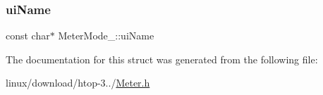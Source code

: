 \mbox{\label{structMeterMode___aa341af0bcb7b2cf5eb53386a21e1d95d}} 
\subsubsection{\texorpdfstring{ui\+Name}{uiName}}
{\footnotesize\ttfamily const char$\ast$ Meter\+Mode\+\_\+\+::ui\+Name}



The documentation for this struct was generated from the following file\+:\begin{DoxyCompactItemize}
\item 
linux/download/htop-\/3../\hyperlink{Meter_8h}{Meter.\+h}\end{DoxyCompactItemize}

